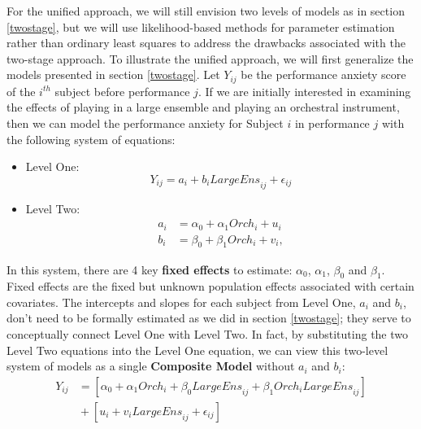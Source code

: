 \documentclass[
]{krantz}
\providecommand{\tightlist}{%
  \setlength{\itemsep}{0pt}\setlength{\parskip}{0pt}}
\begin{document}
For the unified approach, we will still envision two levels of models as in section \ref{twostage}, but we will use likelihood-based methods for parameter estimation rather than ordinary least squares to address the drawbacks associated with the two-stage approach. To illustrate the unified approach, we will first generalize the models presented in section \ref{twostage}. Let \(Y_{ij}\) be the performance anxiety score of the \(i^{th}\) subject before performance \(j\). If we are initially interested in examining the effects of playing in a large ensemble and playing an orchestral instrument, then we can model the performance anxiety for Subject \(i\) in performance \(j\) with the following system of equations:

\begin{itemize}
\tightlist
\item
  Level One:
  \begin{equation}
  Y_{ij} = a_{i}+b_{i}\textstyle{LargeEns}_{ij}+\epsilon_{ij}
  \label{eq:level1large}
  \end{equation}
\item
  Level Two:
  \begin{align*}
  a_{i} & = \alpha_{0}+\alpha_{1}\textstyle{Orch}_{i}+u_{i} \\
  b_{i} & = \beta_{0}+\beta_{1}\textstyle{Orch}_{i}+v_{i},
  \end{align*}
\end{itemize}

In this system, there are 4 key \textbf{fixed effects} to estimate: \(\alpha_{0}\), \(\alpha_{1}\), \(\beta_{0}\) and \(\beta_{1}\). Fixed effects are the fixed but unknown population effects associated with certain covariates. The intercepts and slopes for each subject from Level One, \(a_{i}\) and \(b_{i}\), don't need to be formally estimated as we did in section \ref{twostage}; they serve to conceptually connect Level One with Level Two. In fact, by substituting the two Level Two equations into the Level One equation, we can view this two-level system of models as a single \textbf{Composite Model} without \(a_{i}\) and \(b_{i}\):
\begin{align*}
Y_{ij} & = [\alpha_{0}+\alpha_{1}\textstyle{Orch}_{i}+\beta_{0}\textstyle{LargeEns}_{ij}+\beta_{1}\textstyle{Orch}_{i}\textstyle{LargeEns}_{ij}] \\
 & \textrm{} + [u_{i}+v_{i}\textstyle{LargeEns}_{ij}+\epsilon_{ij}]
\end{align*}
\end{document}
